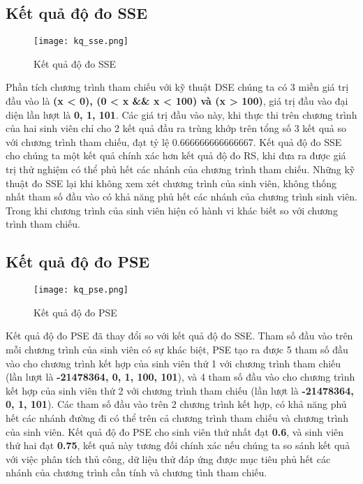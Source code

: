 \subsection{Kết quả độ đo SSE}
\begin{center}
	\begin{figure}[h]
		\begin{center}
			\texttt{[image: kq\_sse.png]}
		\end{center}
		\caption{Kết quả độ đo SSE}		
	\end{figure}
\end{center}

Phần tích chương trình tham chiếu với kỹ thuật DSE chúng ta có 3 miền giá trị đầu vào là \textbf{(x < 0), (0 < x \&\& x < 100) và (x > 100)\textit{}}, giá trị đầu vào đại diện lần lượt là \textbf{0, 1, 101}. Các giá trị đầu vào này, khi thực thi trên chương trình của hai sinh viên chỉ cho 2 kết quả đầu ra trùng khớp trên tổng số 3 kết quả so với chương trình tham chiếu, đạt tỷ lệ 0.666666666666667. Kết quả độ đo SSE cho chúng ta một kết quả chính xác hơn kết quả độ đo RS, khi đưa ra được giá trị thử nghiệm có thể phủ hết các nhánh của chương trình tham chiếu. Những kỹ thuật đo SSE lại khi không xem xét chương trình của sinh viên, không thống nhất tham số đầu vào có khả năng phủ hết các nhánh của chương trình sinh viên. Trong khi chương trình của sinh viên hiện có hành vi khác biết so với chương trình tham chiếu.

\subsection{Kết quả độ đo PSE}
\begin{center}
	\begin{figure}[h]
		\begin{center}
			\texttt{[image: kq\_pse.png]}
		\end{center}
		\caption{Kết quả độ đo PSE}		
	\end{figure}
\end{center}

Kết quả độ đo PSE đã thay đổi so với kết quả độ đo SSE. Tham số đầu vào trên mỗi chương trình của sinh viên có sự khác biệt, PSE tạo ra được 5 tham số đầu vào cho chương trình kết hợp của sinh viên thứ 1 với chương trình tham chiếu (lần lượt là \textbf{-21478364, 0, 1, 100, 101}), và 4 tham số đầu vào cho chương trình kết hợp của sinh viên thứ 2 với chương trình tham chiếu (lần lượt là \textbf{-21478364, 0, 1, 101}). Các tham số đầu vào trên 2 chương trình kết hợp, có khả năng phủ hết các nhánh đường đi có thể trên cả chương trình tham chiếu và chương trình của sinh viên. Kết quả độ đo PSE cho sinh viên thứ nhất đạt \textbf{0.6}, và sinh viên thứ hai đạt \textbf{0.75}, kết quả này tương đối chính xác nếu chúng ta so sánh kết quả với việc phân tích thủ công, dữ liệu thử đáp ứng được mục tiêu phủ hết các nhánh của chương trình cần tính và chương tình tham chiếu.

